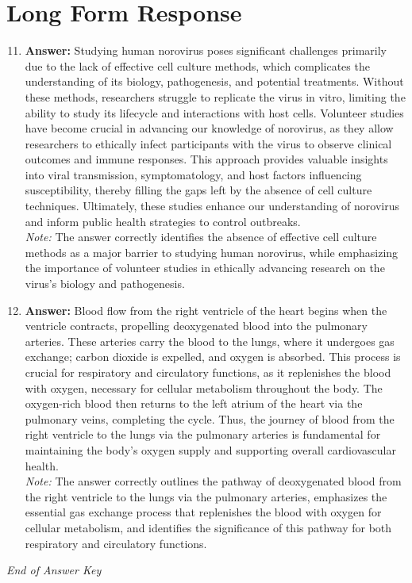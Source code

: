 \documentclass[12pt]{article}
\begin{document}
\section*{Long Form Response}
\begin{enumerate}[label=\arabic*.]
\setcounter{enumi}{10}
\item \textbf{Answer:} Studying human norovirus poses significant challenges primarily due to the lack of effective cell culture methods, which complicates the understanding of its biology, pathogenesis, and potential treatments. Without these methods, researchers struggle to replicate the virus in vitro, limiting the ability to study its lifecycle and interactions with host cells. Volunteer studies have become crucial in advancing our knowledge of norovirus, as they allow researchers to ethically infect participants with the virus to observe clinical outcomes and immune responses. This approach provides valuable insights into viral transmission, symptomatology, and host factors influencing susceptibility, thereby filling the gaps left by the absence of cell culture techniques. Ultimately, these studies enhance our understanding of norovirus and inform public health strategies to control outbreaks.
\\ \textit{Note:} The answer correctly identifies the absence of effective cell culture methods as a major barrier to studying human norovirus, while emphasizing the importance of volunteer studies in ethically advancing research on the virus's biology and pathogenesis.
\item \textbf{Answer:} Blood flow from the right ventricle of the heart begins when the ventricle contracts, propelling deoxygenated blood into the pulmonary arteries. These arteries carry the blood to the lungs, where it undergoes gas exchange; carbon dioxide is expelled, and oxygen is absorbed. This process is crucial for respiratory and circulatory functions, as it replenishes the blood with oxygen, necessary for cellular metabolism throughout the body. The oxygen-rich blood then returns to the left atrium of the heart via the pulmonary veins, completing the cycle. Thus, the journey of blood from the right ventricle to the lungs via the pulmonary arteries is fundamental for maintaining the body's oxygen supply and supporting overall cardiovascular health.
\\ \textit{Note:} The answer correctly outlines the pathway of deoxygenated blood from the right ventricle to the lungs via the pulmonary arteries, emphasizes the essential gas exchange process that replenishes the blood with oxygen for cellular metabolism, and identifies the significance of this pathway for both respiratory and circulatory functions.
\end{enumerate}

\vfill
\noindent\textit{End of Answer Key}
\end{document}

